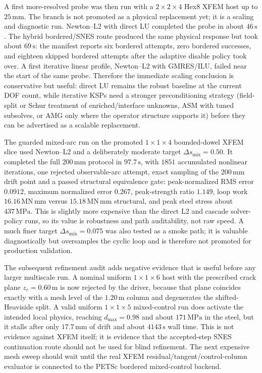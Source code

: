 A first more-resolved probe was then run with a \(2\times2\times4\) Hex8 XFEM
host up to \(25\,\mathrm{mm}\).  The branch is not promoted as a physical
replacement yet; it is a scaling and diagnostic run.  Newton--L2 with direct LU
completed the probe in about \(46\,\mathrm{s}\).  The hybrid bordered/SNES
route produced the same physical response but took about \(69\,\mathrm{s}\):
the manifest reports six bordered attempts, zero bordered successes, and
eighteen skipped bordered attempts after the adaptive disable policy took over.
A first iterative linear profile, Newton--L2 with GMRES/ILU, failed near the
start of the same probe.  Therefore the immediate scaling conclusion is
conservative but useful: direct LU remains the robust baseline at the current
DOF count, while iterative KSPs need a stronger preconditioning strategy
(field-split or Schur treatment of enriched/interface unknowns, ASM with tuned
subsolves, or AMG only where the operator structure supports it) before they
can be advertised as a scalable replacement.

The guarded mixed-arc run on the promoted \(1\times1\times4\) bounded-dowel
XFEM slice used Newton--L2 and a deliberately moderate target
\(\Delta s_{\mathrm{mix}}=0.50\).  It completed the full \(200\,\mathrm{mm}\)
protocol in \(97.7\,\mathrm{s}\), with \(1851\) accumulated nonlinear
iterations, one rejected observable-arc attempt, exact sampling of the
\(200\,\mathrm{mm}\) drift point and a passed structural equivalence gate:
peak-normalized RMS error \(0.0912\), maximum normalized error \(0.267\),
peak-strength ratio \(1.149\), loop work \(16.16\,\mathrm{MN\,mm}\) versus
\(15.18\,\mathrm{MN\,mm}\) structural, and peak steel stress about
\(437\,\mathrm{MPa}\).  This is slightly more expensive than the direct L2 and
cascade solver-policy runs, so its value is robustness and path auditability,
not raw speed.  A much finer target
\(\Delta s_{\mathrm{mix}}=0.075\) was also tested as a smoke path; it is
valuable diagnostically but oversamples the cyclic loop and is therefore not
promoted for production validation.

The subsequent refinement audit adds negative evidence that is useful before
any larger multiscale run.  A nominal uniform \(1\times1\times6\) host with the
prescribed crack plane \(z_c=0.60\,\mathrm{m}\) is now rejected by the driver,
because that plane coincides exactly with a mesh level of the
\(1.20\,\mathrm{m}\) column and degenerates the shifted-Heaviside split.  A
valid uniform \(1\times1\times5\) mixed-control run does activate the intended
local physics, reaching \(d_{\max}=0.98\) and about \(171\,\mathrm{MPa}\) in the
steel, but it stalls after only \(17.7\,\mathrm{mm}\) of drift and about
\(4143\,\mathrm{s}\) wall time.  This is not evidence against XFEM itself; it
is evidence that the accepted-step SNES continuation route should not be used
for blind refinement.  The next expensive mesh sweep should wait until the real
XFEM residual/tangent/control-column evaluator is connected to the PETSc
bordered mixed-control backend.

